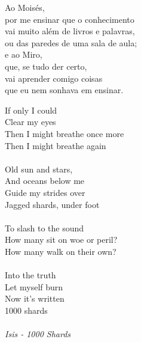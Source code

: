 \newpage

\vspace*{0.7\textheight}
\begin{flushright}

    Ao Moisés, \\ 
    por me ensinar que o conhecimento \\ 
    vai muito além de livros e palavras, \\
    ou das paredes de uma sala de aula; \\
    \vspace{0.5 cm}
    e ao Miro, \\
    que, se tudo der certo, \\ 
    vai aprender comigo coisas \\
    que eu nem sonhava em ensinar.

\end{flushright}

\newpage

\vspace*{0.2\textheight}
{\noindent 
If only I could \\
Clear my eyes \\
Then I might breathe once more \\
Then I might breathe again \\
\vspace{0.2 cm} \\
Old sun and stars, \\
And oceans below me \\
Guide my strides over \\
Jagged shards, under foot \\
\vspace{0.2 cm} \\
To slash to the sound \\
How many sit on woe or peril? \\
How many walk on their own? \\
\vspace{0.2 cm} \\
Into the truth \\
Let myself burn \\
Now it's written \\
1000 shards \\
\vspace{0.2 cm} \\
\emph {Isis - 1000 Shards}
}

